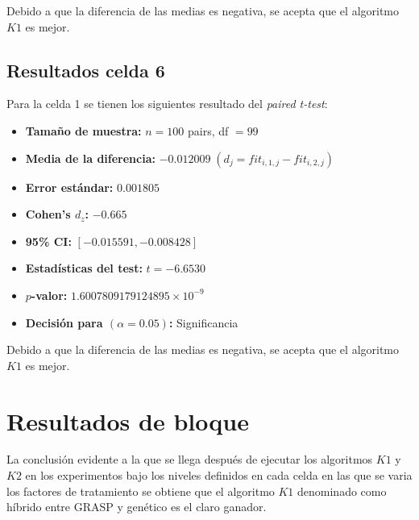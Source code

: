 Debido a que la diferencia de las medias es negativa, se acepta que el algoritmo $K1$ es mejor.

\subsection{Resultados celda 6}
Para la celda 1 se tienen los siguientes resultado del \textit{paired t-test}:
\begin{itemize}
    \item \textbf{Tamaño de muestra:} $n=100$ pairs, df $=99$
    \item \textbf{Media de la diferencia:} $-0.012009 \; (d_j = fit_{i,1,j} - fit_{i,2,j})$
    \item \textbf{Error estándar:} $0.001805$
    \item \textbf{Cohen's $d_z$:} $-0.665$
    \item \textbf{95\% CI:} $[-0.015591, -0.008428]$
    \item \textbf{Estadísticas del test:} $t = -6.6530$
    \item \textbf{$p$-valor:} $1.6007809179124895 \times 10^{-9}$
    \item \textbf{Decisión para $(\alpha = 0.05)$:} Significancia
\end{itemize}

Debido a que la diferencia de las medias es negativa, se acepta que el algoritmo $K1$ es mejor.

\section{Resultados de bloque}

La conclusión evidente a la que se llega después de ejecutar los algoritmos $K1$ y $K2$ en los experimentos bajo los niveles definidos en cada celda en las que se varia los factores de tratamiento se obtiene que el algoritmo $K1$ denominado como híbrido entre GRASP y genético es el claro ganador.